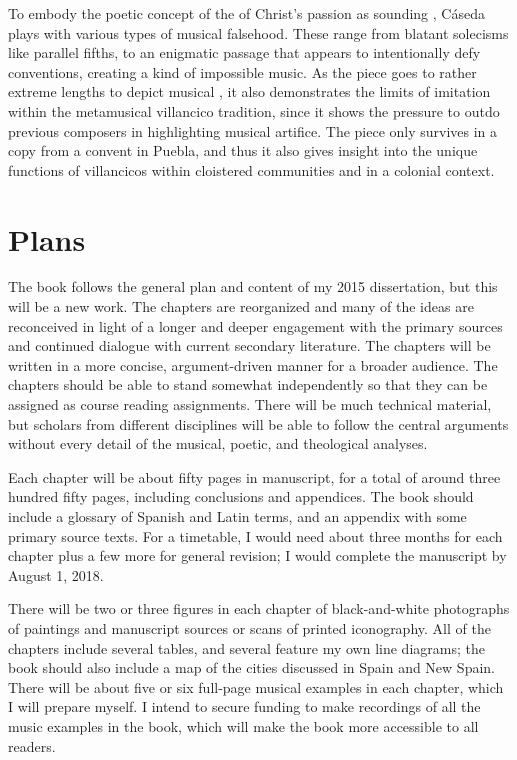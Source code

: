 \documentclass{vcbook-proposal}
\begin{document}
To embody the poetic concept of the  of Christ's passion as 
sounding , Cáseda plays with various types of musical falsehood.
These range from blatant solecisms like parallel fifths, to an enigmatic passage
that appears to intentionally defy  conventions, creating a
kind of impossible music.
As the piece goes to rather extreme lengths to depict musical 
, it also demonstrates the limits of imitation within the 
metamusical villancico tradition, since it shows the pressure to outdo previous 
composers in highlighting musical artifice.
The piece only survives in a copy from a convent in Puebla, and thus it also 
gives insight into the unique functions of villancicos within cloistered 
communities and in a colonial context.

\section{Plans}

The book follows the general plan and content of my 2015 dissertation, but this 
will be a new work.%
    \Autocite{Cashner:PhD}
The chapters are reorganized and many of the ideas are reconceived in light of a
longer and deeper engagement with the primary sources and continued dialogue
with current secondary literature.
The chapters will be written in a more concise, argument-driven manner for a
broader audience.
The chapters should be able to stand somewhat independently so that they can be
assigned as course reading assignments.
There will be much technical material, but scholars from different disciplines 
will be able to follow the central arguments without every detail of the 
musical, poetic, and theological analyses.

Each chapter will be about fifty pages in manuscript, for a total of around
three hundred fifty pages, including conclusions and appendices.
The book should include a glossary of Spanish and Latin terms, and an appendix 
with some primary source texts.
For a timetable, I would need about three months for each chapter plus a few 
more for general revision; I would complete the manuscript by August 1, 2018.

There will be two or three figures in each chapter of black-and-white
photographs of paintings and manuscript sources or scans of printed iconography.
All of the chapters include several tables, and several feature my own line
diagrams; the book should also include a map of the cities discussed in Spain
and New Spain.  
There will be about five or six full-page musical examples in each chapter,
which I will prepare myself.
I intend to secure funding to make recordings of all the music examples in the
book, which will make the book more accessible to all readers.
\end{document}
